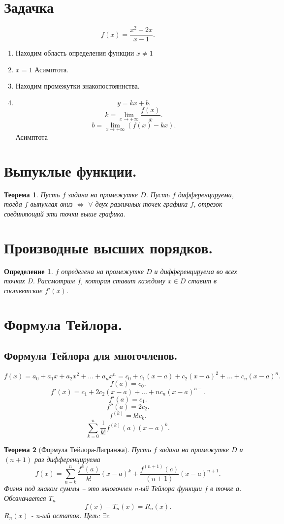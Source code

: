 \documentclass[a4paper]{scrartcl}
\newtheorem{theorem}{Теорема}
\newtheorem{definition}{Определение}
\begin{document}
\section{Задачка}
\[
f(x) = \frac{x^2 - 2x}{x - 1}
.\] 
\begin{enumerate}
    \item Находим область определения функции $x \neq 1$
    \item $x = 1$ Асимптота.
    \item   Находим промежутки знакопостояннства.
    \item
        \[
            y = kx + b
        .\] 
        \[
        k = \lim_{x \to + \infty} \frac{f(x)}{x}
        .\] 
        \[
        b = \lim_{x \to + \infty} (f(x) - kx)
        .\] 
        Асимптота
\end{enumerate}
\section{Выпуклые функции.}
\begin{theorem}
    Пусть $f$ задана на промежутке $D$. Пусть $f$ дифференцируема, тогда $f$ выпуклая вниз  $\iff$ $\forall $ двух различных точек графика $f$, отрезок соединяющий эти точки выше графика.
\end{theorem}
\section{Производные высших порядков.}
\begin{definition}
    $f$ определена на промежутке  $D$ и дифференцируема во всех точках D.
    Рассмотрим  $f$, которая ставит каждому  $x \in D$ ставит в соответские  $f'(x)$.
\end{definition}
\section{Формула Тейлора.}
\subsection{Формула Тейлора для многочленов.}
\[
f(x) = a_0 + a_1x + a_2x^2 + \dots + a_nx^n = c_0  + c_1(x-a) + c_2(x - a)^2 + \dots + c_n(x - a)^n
.\] 
\[
f(a) = c_0
.\] 
\[
    f'(x) = c_1 + 2c_2(x - a) + \dots + nc_n (x - a)^{n - }
.\] 
\[
f'(a) = c_1
.\] 
\[
f''(a) = 2c_2
.\] 
\[
    f^{(k)} = k! c_k
.\] 
\[
    \sum_{k = 0}^{n} \frac{1}{k!} f^{(k)}(a)(x - a)^k
.\]
\begin{theorem}[Формула Тейлора-Лагранжа]
    Пусть $f$ задана на промежутке  $D$ и $( n + 1 )$ раз дифференцируема 
    \[
        f(x) = \sum_{n - k}^{n}  \frac{f^{k}(a)}{k!} (x - a)^k + \frac{f^{(n + 1)}(c)}{( n+1 )} (x - a)^{n + 1}
    .\] 
    Фигня под знаком суммы -- это многочлен n-ый  Тейлора функции $f$ в точке а. Обозначается $T_n$ 
    \[
    f(x) - T_n(x) =  R_n(x)
    .\] 
    $R_n(x)$ - n-ый остаток.
    Цель: $\exists  c$ 
\end{theorem}
\end{document}
